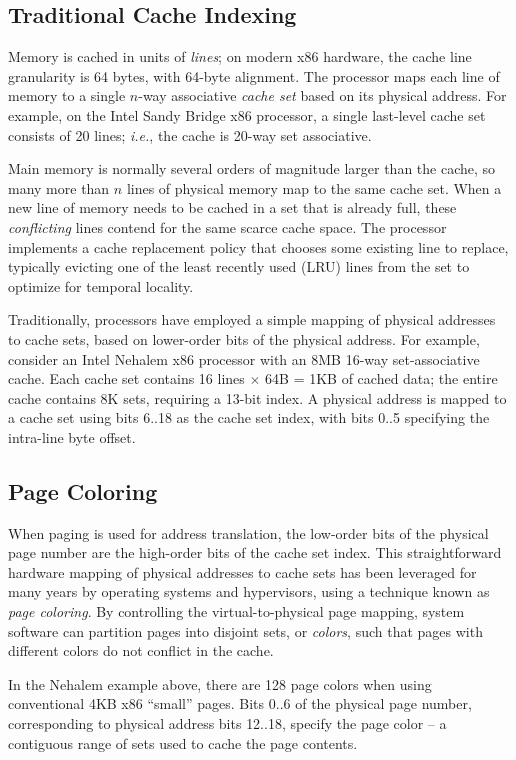 \subsection{Traditional Cache Indexing}

Memory is cached in units of {\em lines}; on modern x86 hardware, the
cache line granularity is 64 bytes, with 64-byte alignment.  The
processor maps each line of memory to a single $n$-way associative
{\em cache set} based on its physical address.  For example, on the
Intel Sandy Bridge x86 processor, a single last-level cache set
consists of 20 lines; {\em i.e.}, the cache is 20-way set associative.

Main memory is normally several orders of magnitude larger than the
cache, so many more than $n$ lines of physical memory map to the
same cache set.  When a new line of memory needs to be cached in a set
that is already full, these {\em conflicting} lines contend for the
same scarce cache space.  The processor implements a cache replacement
policy that chooses some existing line to replace, typically evicting
one of the least recently used (LRU) lines from the set to optimize
for temporal locality.

Traditionally, processors have employed a simple mapping of physical
addresses to cache sets, based on lower-order bits of the physical
address.  For example, consider an Intel Nehalem x86 processor with an
8MB 16-way set-associative cache.  Each cache set contains 16 lines
$\times$ 64B = 1KB of cached data; the entire cache contains 8K sets,
requiring a 13-bit index.  A physical address is mapped to a cache set
using bits 6..18 as the cache set index, with bits 0..5 specifying the
intra-line byte offset.

\subsection{Page Coloring}

When paging is used for address translation, the low-order bits of the
physical page number are the high-order bits of the cache set index.
This straightforward hardware mapping of physical addresses to cache
sets has been leveraged for many years by operating systems and
hypervisors, using a technique known as {\em page coloring}.  By
controlling the virtual-to-physical page mapping, system software can
partition pages into disjoint sets, or {\em colors}, such that pages
with different colors do not conflict in the cache.

In the Nehalem example above, there are 128 page colors when using
conventional 4KB x86 ``small'' pages. Bits 0..6 of the physical page
number, corresponding to physical address bits 12..18, specify the
page color -- a contiguous range of sets used to cache the page
contents.

